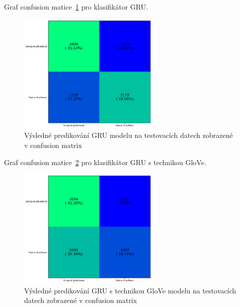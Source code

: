 Graf confusion matice~\ref{fig:MULTI GRU model conf} pro klasifikátor GRU.\@
\begin{figure}[H]
	\centering
	\includegraphics[width=0.6\textwidth]{Figures/MULTI_GRU_conf.png}
	\caption{Výsledné predikování GRU modelu na testovacích datech zobrazené v confusion matrix}\label{fig:MULTI GRU model conf}
\end{figure}

Graf confusion matice~\ref{fig:MULTI GRU GloVe model conf} pro klasifikátor GRU s technikou GloVe.
\begin{figure}[H]
	\centering
	\includegraphics[width=0.6\textwidth]{Figures/MULTI_GRU_GLOVE_conf.png}
	\caption{Výsledné predikování GRU s technikou GloVe modelu na testovacích datech zobrazené v confusion matrix}\label{fig:MULTI GRU GloVe model conf}
\end{figure}

